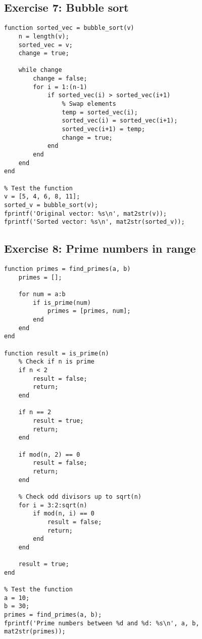 \documentclass[oneside]{article}
\begin{document}
\subsection*{Exercise 7: Bubble sort}

\begin{verbatim}
function sorted_vec = bubble_sort(v)
    n = length(v);
    sorted_vec = v;
    change = true;
    
    while change
        change = false;
        for i = 1:(n-1)
            if sorted_vec(i) > sorted_vec(i+1)
                % Swap elements
                temp = sorted_vec(i);
                sorted_vec(i) = sorted_vec(i+1);
                sorted_vec(i+1) = temp;
                change = true;
            end
        end
    end
end

% Test the function
v = [5, 4, 6, 8, 11];
sorted_v = bubble_sort(v);
fprintf('Original vector: %s\n', mat2str(v));
fprintf('Sorted vector: %s\n', mat2str(sorted_v));
\end{verbatim}

\subsection*{Exercise 8: Prime numbers in range}

\begin{verbatim}
function primes = find_primes(a, b)
    primes = [];
    
    for num = a:b
        if is_prime(num)
            primes = [primes, num];
        end
    end
end

function result = is_prime(n)
    % Check if n is prime
    if n < 2
        result = false;
        return;
    end
    
    if n == 2
        result = true;
        return;
    end
    
    if mod(n, 2) == 0
        result = false;
        return;
    end
    
    % Check odd divisors up to sqrt(n)
    for i = 3:2:sqrt(n)
        if mod(n, i) == 0
            result = false;
            return;
        end
    end
    
    result = true;
end

% Test the function
a = 10;
b = 30;
primes = find_primes(a, b);
fprintf('Prime numbers between %d and %d: %s\n', a, b, mat2str(primes));
\end{verbatim}
\end{document}

